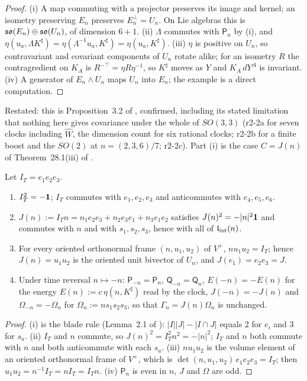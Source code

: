 \begin{proof}
(i) A map commuting with a projector preserves its image and kernel; an isometry preserving $E_n$ preserves $E_n^\perp=U_n$. On Lie algebras this is
$\mathfrak{so}(E_n)\oplus\mathfrak{so}(U_n)$, of dimension $6+1$. (ii) $\Lambda$ commutes with $\mathsf P_n$ by (i), and $\eta(u_a,\Lambda K^\sharp)=\eta(\Lambda^{-1}u_a,K^\sharp)
=\eta(u_a,K^\sharp)$. (iii) $\eta$ is positive on $U_n$, so contravariant and covariant components of $U_n$ rotate alike; for an isometry $R$ the
contragredient on $K_A$ is $R^{-\top}=\eta R\eta^{-1}$, so $K^\sharp$ moves as $Y$ and $K_A\,dY^A$ is invariant. (iv) A generator of $E_n\wedge U_n$
maps $U_n$ into $E_n$; the example is a direct computation.
\end{proof}

Restated: this is Proposition~3.2 of \cite{FMB}, confirmed, including its stated limitation that nothing here gives covariance under the whole
of $SO(3,3)$ (r2-2a for seven clocks including $\widehat W$, the dimension count for six rational clocks; r2-2b for a finite boost and the $SO(2)$ at
$n=(2,3,6)/7$; r2-2c). Part (i) is the case $C=J(n)$ of Theorem~28.1(iii) of \cite{ES17}.

\begin{proposition}
\label{r2:prop:J}
Let $I_T=e_1e_2e_3$.
\begin{enumerate}[label=(\roman*),leftmargin=2.2em]
\item $I_T^2=-\mathbf 1$; $I_T$ commutes with $e_1,e_2,e_3$ and anticommutes with $e_4,e_5,e_6$.
\item $J(n):=I_Tn=n_1e_2e_3+n_2e_3e_1+n_3e_1e_2$ satisfies $J(n)^2=-|n|^2\mathbf 1$ and commutes with $n$ and with $s_1,s_2,s_3$, hence with all of $\mathfrak l_{\rm int}(n)$.
\item For every oriented orthonormal frame $(n,u_1,u_2)$ of $V^+$, $nu_1u_2=I_T$; hence $J(n)=u_1u_2$ is the oriented unit bivector of $U_n$, and
$J(e_1)=e_2e_3=J$.
\item Under time reversal $n\mapsto-n$: $\mathsf P_{-n}=\mathsf P_n$, $\mathsf Q_{-n}=\mathsf Q_n$, $E(-n)=-E(n)$ for the energy
$E(n):=c\,\eta(n,K^\sharp)$ read by the clock, $J(-n)=-J(n)$ and
$\Omega_{-n}=-\Omega_n$ for $\Omega_n:=ns_1s_2s_3$, so that $\Gamma_n=J(n)\Omega_n$ is unchanged.
\end{enumerate}
\end{proposition}

\begin{proof}
(i) is the blade rule (Lemma~2.1 of \cite{ES17}): $|I||J|-|I\cap J|$ equals $2$ for $e_i$ and $3$ for $s_a$. (ii) $I_T$ and $n$
commute, so $J(n)^2=I_T^2n^2=-|n|^2$; $I_T$ and $n$ both commute with $n$ and both anticommute with each $s_a$. (iii) $nu_1u_2$ is the volume element of
an oriented orthonormal frame of $V^+$, which is $\det(n,u_1,u_2)\,e_1e_2e_3=I_T$; then $u_1u_2=n^{-1}I_T=nI_T=I_Tn$. (iv) $\mathsf P_n$ is even in $n$,
$J$ and $\Omega$ are odd.
\end{proof}

